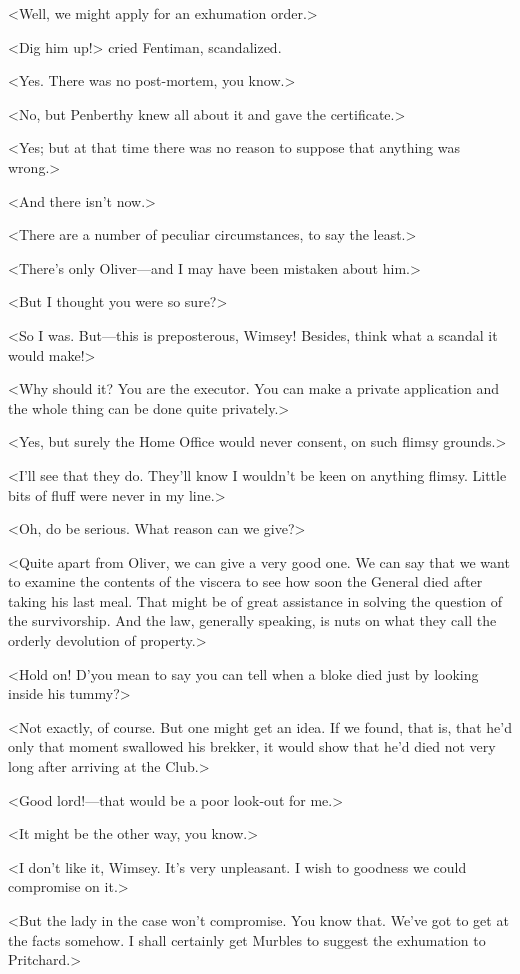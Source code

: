 <Well, we might apply for an exhumation order.>

<Dig him up!> cried Fentiman, scandalized.

<Yes. There was no post-mortem, you know.>

<No, but Penberthy knew all about it and gave the certificate.>

<Yes; but at that time there was no reason to suppose that anything was wrong.>

<And there isn't now.>

<There are a number of peculiar circumstances, to say the least.>

<There's only Oliver—and I may have been mistaken about him.>

<But I thought you were so sure?>

<So I was. But—this is preposterous, Wimsey! Besides, think what a scandal it would make!>

<Why should it? You are the executor. You can make a private application and the whole thing can be done quite privately.>

<Yes, but surely the Home Office would never consent, on such flimsy grounds.>

<I'll see that they do. They'll know I wouldn't be keen on anything flimsy. Little bits of fluff were never in my line.>

<Oh, do be serious. What reason can we give?>

<Quite apart from Oliver, we can give a very good one. We can say that we want to examine the contents of the viscera to see how soon the General died after taking his last meal. That might be of great assistance in solving the question of the survivorship. And the law, generally speaking, is nuts on what they call the orderly devolution of property.>

<Hold on! D'you mean to say you can tell when a bloke died just by looking inside his tummy?>

<Not exactly, of course. But one might get an idea. If we found, that is, that he'd only that moment swallowed his brekker, it would show that he'd died not very long after arriving at the Club.>

<Good lord!—that would be a poor look-out for me.>

<It might be the other way, you know.>

<I don't like it, Wimsey. It's very unpleasant. I wish to goodness we could compromise on it.>

<But the lady in the case won't compromise. You know that. We've got to get at the facts somehow. I shall certainly get Murbles to suggest the exhumation to Pritchard.>

